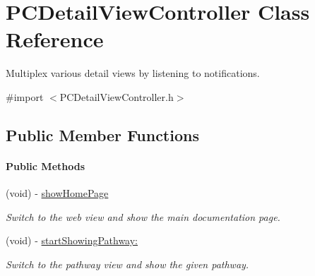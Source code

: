 \hypertarget{interface_p_c_detail_view_controller}{
\section{PCDetailViewController Class Reference}
\label{interface_p_c_detail_view_controller}
}


Multiplex various detail views by listening to notifications.  




{\ttfamily \#import $<$PCDetailViewController.h$>$}

\subsection*{Public Member Functions}
\begin{Indent}\paragraph*{Public Methods}
\begin{DoxyCompactItemize}
\item 
\hypertarget{interface_p_c_detail_view_controller_abf7a198bd52befdf94b69403a5de28f9}{
(void) -\/ \hyperlink{interface_p_c_detail_view_controller_abf7a198bd52befdf94b69403a5de28f9}{showHomePage}}
\label{interface_p_c_detail_view_controller_abf7a198bd52befdf94b69403a5de28f9}

\begin{DoxyCompactList}\small\item\em Switch to the web view and show the main documentation page. \end{DoxyCompactList}\item 
\hypertarget{interface_p_c_detail_view_controller_a4614f1f9df6b10ae830608d686176a23}{
(void) -\/ \hyperlink{interface_p_c_detail_view_controller_a4614f1f9df6b10ae830608d686176a23}{startShowingPathway:}}
\label{interface_p_c_detail_view_controller_a4614f1f9df6b10ae830608d686176a23}

\begin{DoxyCompactList}\small\item\em Switch to the pathway view and show the given pathway. \end{DoxyCompactList}\end{DoxyCompactItemize}
\end{Indent}

